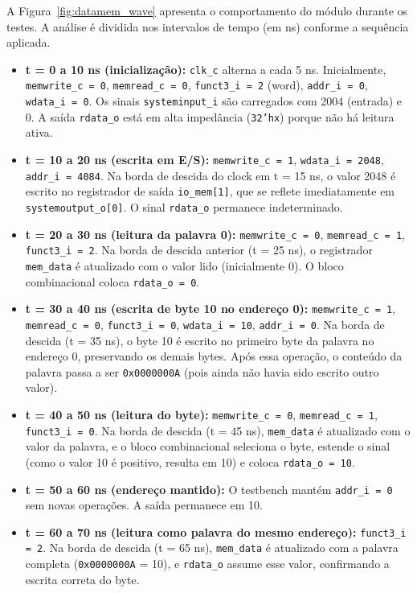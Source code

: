 \documentclass[
	12pt,				%
	oneside,
	a4paper,			%
	english,			%
	french,				%
	spanish,			%
	brazil,				%
	]{abntex2}
\begin{document}
A Figura~\ref{fig:datamem_wave} apresenta o comportamento do módulo durante os testes. A análise é dividida nos intervalos de tempo (em ns) conforme a sequência aplicada.

\begin{itemize}
  \item \textbf{t = 0 a 10 ns (inicialização):}  
  \texttt{clk\_c} alterna a cada 5 ns. Inicialmente, \texttt{memwrite\_c = 0}, \texttt{memread\_c = 0}, \texttt{funct3\_i = 2} (word), \texttt{addr\_i = 0}, \texttt{wdata\_i = 0}. Os sinais \texttt{systeminput\_i} são carregados com 2004 (entrada) e 0. A saída \texttt{rdata\_o} está em alta impedância (\texttt{32'hx}) porque não há leitura ativa.

  \item \textbf{t = 10 a 20 ns (escrita em E/S):}  
  \texttt{memwrite\_c = 1}, \texttt{wdata\_i = 2048}, \texttt{addr\_i = 4084}. Na borda de descida do clock em t = 15 ns, o valor 2048 é escrito no registrador de saída \texttt{io\_mem[1]}, que se reflete imediatamente em \texttt{systemoutput\_o[0]}. O sinal \texttt{rdata\_o} permanece indeterminado.

  \item \textbf{t = 20 a 30 ns (leitura da palavra 0):}  
  \texttt{memwrite\_c = 0}, \texttt{memread\_c = 1}, \texttt{funct3\_i = 2}. Na borda de descida anterior (t = 25 ns), o registrador \texttt{mem\_data} é atualizado com o valor lido (inicialmente 0). O bloco combinacional coloca \texttt{rdata\_o = 0}.

  \item \textbf{t = 30 a 40 ns (escrita de byte 10 no endereço 0):}  
  \texttt{memwrite\_c = 1}, \texttt{memread\_c = 0}, \texttt{funct3\_i = 0}, \texttt{wdata\_i = 10}, \texttt{addr\_i = 0}. Na borda de descida (t = 35 ns), o byte 10 é escrito no primeiro byte da palavra no endereço 0, preservando os demais bytes. Após essa operação, o conteúdo da palavra passa a ser \texttt{0x0000000A} (pois ainda não havia sido escrito outro valor).

  \item \textbf{t = 40 a 50 ns (leitura do byte):}  
  \texttt{memwrite\_c = 0}, \texttt{memread\_c = 1}, \texttt{funct3\_i = 0}. Na borda de descida (t = 45 ns), \texttt{mem\_data} é atualizado com o valor da palavra, e o bloco combinacional seleciona o byte, estende o sinal (como o valor 10 é positivo, resulta em 10) e coloca \texttt{rdata\_o = 10}.

  \item \textbf{t = 50 a 60 ns (endereço mantido):}  
  O testbench mantém \texttt{addr\_i = 0} sem novas operações. A saída permanece em 10.

  \item \textbf{t = 60 a 70 ns (leitura como palavra do mesmo endereço):}  
  \texttt{funct3\_i = 2}. Na borda de descida (t = 65 ns), \texttt{mem\_data} é atualizado com a palavra completa (\texttt{0x0000000A} = 10), e \texttt{rdata\_o} assume esse valor, confirmando a escrita correta do byte.
\end{itemize}
\end{document}
